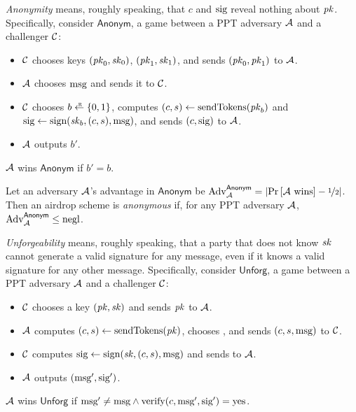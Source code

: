 \medskip\noindent\textit{Anonymity} means, roughly speaking, that $c$ and $\text{sig}$ reveal
    nothing about $\mathit{pk}$.
Specifically, consider $\mathsf{Anonym}$, a game between a PPT adversary $\mathcal{A}$
    and a challenger $\mathcal{C}$:
%
\begin{itemize}
\item $\mathcal{C}$ chooses keys $(\mathit{pk}_0, \mathit{sk}_0)$, $(\mathit{pk}_1, \mathit{sk}_1)$, and sends $(\mathit{pk}_0, \mathit{pk}_1)$ to $\mathcal{A}$.

\item $\mathcal{A}$ chooses $\text{msg}$ and sends it to $\mathcal{C}$.

\item $\mathcal{C}$ chooses $b \rgets \{0,1\}$,
computes $(c, s) \gets \text{sendTokens}(\mathit{pk}_b)$ and
$\text{sig} \gets \text{sign}(\mathit{sk}_b, (c, s), \text{msg})$,
and sends $(c, \text{sig})$ to $\mathcal{A}$.

\item $\mathcal{A}$ outputs $b'$.

\end{itemize}
%
$\mathcal{A}$ wins $\mathsf{Anonym}$ if $b' = b$.

\begin{definition}
Let an adversary $\mathcal{A}$'s advantage in $\mathsf{Anonym}$ be
$\mathrm{Adv}_{\mathcal{A}}^{\mathsf{Anonym}} = \left|{\operatorname*{Pr}\left[{\mathcal{A}~\text{wins}}\right] - \nicefrac{1}{2}}\right|$.
Then an airdrop scheme is \emph{anonymous} if, for any PPT adversary
    $\mathcal{A}$, $\mathrm{Adv}_{\mathcal{A}}^{\mathsf{Anonym}} \le \text{negl}$.
\end{definition}


\medskip\noindent\textit{Unforgeability} means, roughly speaking, that
    a party that does not know $\mathit{sk}$ cannot generate a valid signature
    for any message, even if it knows a valid signature for any other
    message.
Specifically, consider $\mathsf{Unforg}$, a game between a PPT adversary
    $\mathcal{A}$ and a challenger $\mathcal{C}$:
%
\begin{itemize}
\item $\mathcal{C}$ chooses a key $(\mathit{pk}, \mathit{sk})$ and sends $\mathit{pk}$ to $\mathcal{A}$.

\item $\mathcal{A}$ computes $(c, s) \gets \text{sendTokens}(\mathit{pk})$, chooses \msg, and sends $(c, s, \text{msg})$ to $\mathcal{C}$.

\item $\mathcal{C}$ computes $\text{sig} \gets \text{sign}(\mathit{sk}, (c, s), \text{msg})$ and sends to $\mathcal{A}$.

\item $\mathcal{A}$ outputs $(\text{msg}', \text{sig}')$.

\end{itemize}
%
$\mathcal{A}$ wins $\mathsf{Unforg}$ if $\text{msg}' \neq \text{msg} \wedge \text{verify}(c, \text{msg}', \text{sig}') = \text{yes}$.

